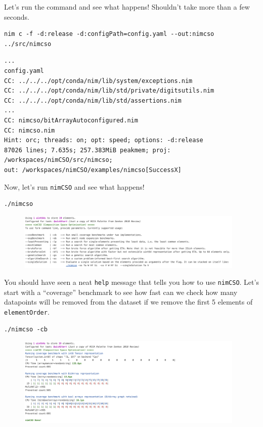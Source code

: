 Let's run the command and see what happens! Shouldn't take more than a
few seconds.

\begin{verbatim}
nim c -f -d:release -d:configPath=config.yaml --out:nimcso ../src/nimcso 
\end{verbatim}

\begin{verbatim}
...
config.yaml
CC: ../../../opt/conda/nim/lib/system/exceptions.nim
CC: ../../../opt/conda/nim/lib/std/private/digitsutils.nim
CC: ../../../opt/conda/nim/lib/std/assertions.nim
...
CC: nimcso/bitArrayAutoconfigured.nim
CC: nimcso.nim
Hint: orc; threads: on; opt: speed; options: -d:release
87026 lines; 7.635s; 257.383MiB peakmem; proj: /workspaces/nimCSO/src/nimcso; 
out: /workspaces/nimCSO/examples/nimcso[SuccessX]
\end{verbatim}

Now, let's run \texttt{nimCSO} and see what happens!

\begin{verbatim}
./nimcso
\end{verbatim}

\begin{figure}[H]
  \centering
  \includegraphics[width=0.97\textwidth]{nimcsotutorial/1.png}
\end{figure}

You should have seen a neat \texttt{help} message that
tells you how to use \texttt{nimCSO}. Let's start with
a ``coverage'' benchmark to see how fast can we check how many
datapoints will be removed from the dataset if we remove the first 5
elements of \texttt{elementOrder}.

\begin{verbatim}
./nimcso -cb
\end{verbatim}

\begin{figure}[H]
  \centering
  \includegraphics[width=0.97\textwidth]{nimcsotutorial/2.png}
\end{figure}


